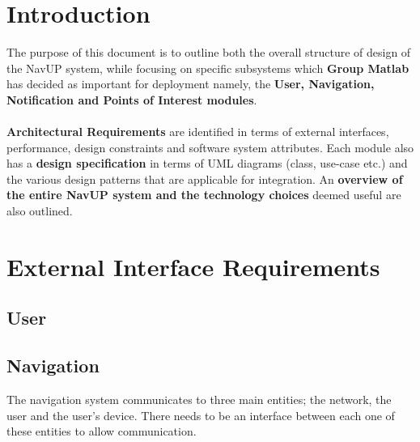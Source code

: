 \documentclass[runningheads,a4paper]{article}
\begin{document}



\begingroup



\tableofcontents


\endgroup

\newpage

\section{Introduction}
The purpose of this document is to outline both the overall structure of design of the NavUP system, while focusing on specific subsystems which \textbf{Group Matlab} has decided as important for deployment namely, the \textbf{User, Navigation, Notification and Points of Interest modules}.\\ \\
\noindent
\textbf{Architectural Requirements} are identified in terms of external interfaces, performance, design constraints and software system attributes. Each module also has a \textbf{design specification} in terms of UML diagrams (class, use-case etc.) and the various design patterns that are applicable for integration. An \textbf{overview of the entire NavUP system and the technology choices} deemed useful are also outlined.

\section{External Interface Requirements}

\subsection{User}

\subsection{Navigation}
The navigation system communicates to three main entities; the network, the user and the user’s device. There needs to be an interface between each one of these entities to allow communication.
\end{document}
